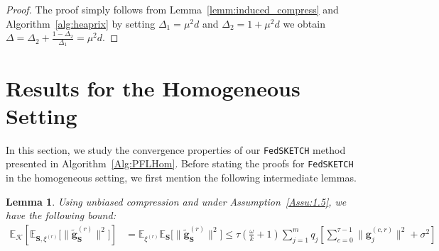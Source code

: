 \documentclass[twoside]{article}
\newtheorem{lemma}{Lemma}
\begin{document}
\begin{proof}
The proof simply follows from Lemma~\ref{lemm:induced_compress} and Algorithm~\ref{alg:heaprix} by setting $\Delta_1=\mu^2d$ and $\Delta_2=1+\mu^2d$ we obtain $\Delta=\Delta_2+\frac{1-\Delta_2}{\Delta_1}=\mu^2d$.
\end{proof}


\section{Results for the Homogeneous Setting}
\label{sec:app:sgd:undrr-pl}



In this section, we study the convergence properties of our  \texttt{FedSKETCH} method presented in Algorithm~\ref{Alg:PFLHom}. Before stating the proofs for \texttt{FedSKETCH} in the homogeneous setting, we first mention the following intermediate lemmas. 



\begin{lemma}\label{lemma:tasbih1-iid}
Using unbiased compression and under Assumption~\ref{Assu:1.5}, we have the following bound: 
\begin{align}
\mathbb{E}_{\mathcal{K}}\left[\mathbb{E}_{{\mathbf{S},\xi^{(r)}}}\Big[\|\tilde{\mathbf{g}}_{\mathbf{S}}^{(r)}\|^2\Big]\right]&=\mathbb{E}_{{\xi}^{(r)}}\mathbb{E}_{\mathbf{S}}\Big[\|\tilde{\mathbf{g}}_\mathbf{S}^{(r)}\|^2\Big]\leq \tau(\frac{\omega}{k}+1)\sum_{j=1}^mq_j\left[\sum_{c=0}^{\tau-1}\|\mathbf{g}_j^{(c,r)}\|^2+\sigma^2\right] \label{eq:lemma1}
\end{align}
\end{lemma}
\end{document}
